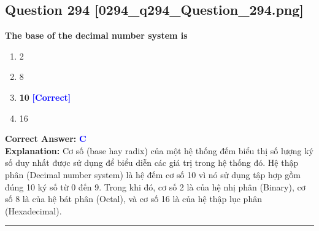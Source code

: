 \documentclass[11pt,a4paper]{article}
\begin{document}
\begin{minipage}{\textwidth}
\subsection*{Question 294 \quad \footnotesize{[0294\_q294\_Question\_294.png]}}
\noindent \textbf{The base of the decimal number system is}

\begin{enumerate}[label=\Alph*.]
    \item 2
    \item 8
    \item \textbf{10} \hfill \textcolor{blue}{\textbf{[Correct]}}
    \item 16
\end{enumerate}

\noindent \textbf{Correct Answer:} \textcolor{blue}{\textbf{C}} \\[2pt]
\noindent \textbf{Explanation:} Cơ số (base hay radix) của một hệ thống đếm biểu thị số lượng ký số duy nhất được sử dụng để biểu diễn các giá trị trong hệ thống đó. Hệ thập phân (Decimal number system) là hệ đếm cơ số 10 vì nó sử dụng tập hợp gồm đúng 10 ký số từ 0 đến 9. Trong khi đó, cơ số 2 là của hệ nhị phân (Binary), cơ số 8 là của hệ bát phân (Octal), và cơ số 16 là của hệ thập lục phân (Hexadecimal).

\par\vspace{0.3cm}
\hrule
\vspace{0.3cm}
\end{minipage}
\end{document}
